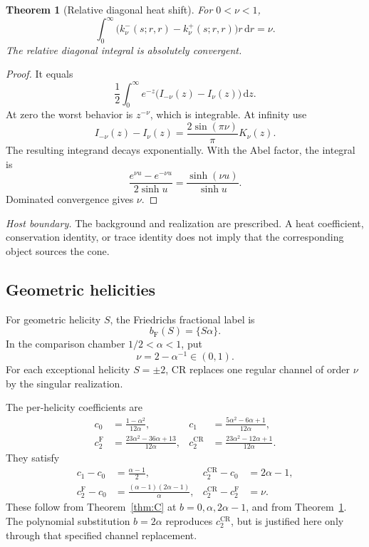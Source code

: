 \documentclass[11pt,a4paper]{article}
\newcommand{\dd}{\mathrm d}
\newcommand{\Fr}{\mathrm F}
\newcommand{\CR}{\mathrm{CR}}
\theoremstyle{plain}
\newtheorem{theorem}{Theorem}[section]
\theoremstyle{definition}
\theoremstyle{remark}
\numberwithin{equation}{section}
\newcommand{\nonsource}{%
  \par\smallskip\noindent
  \emph{Host boundary.}
  The background and realization are prescribed.
  A heat coefficient, conservation identity, or trace identity does
  not imply that the corresponding object sources the cone.%
}
\begin{document}
\begin{theorem}[Relative diagonal heat shift]
\label{thm:flip}
For \(0<\nu<1\),
\begin{equation}
 \int_0^\infty
 \bigl(k_\nu^-(s;r,r)-k_\nu^+(s;r,r)\bigr)r\,\dd r
 =\nu.
 \label{eq:flip}
\end{equation}
The relative diagonal integral is absolutely convergent.
\end{theorem}

\begin{proof}
It equals
\[
 \frac12\int_0^\infty
 e^{-z}\bigl(I_{-\nu}(z)-I_\nu(z)\bigr)\,\dd z.
\]
At zero the worst behavior is \(z^{-\nu}\), which is integrable.
At infinity use
\[
 I_{-\nu}(z)-I_\nu(z)
 =\frac{2\sin(\pi\nu)}{\pi}K_\nu(z).
\]
The resulting integrand decays exponentially.
With the Abel factor, the integral is
\[
 \frac{e^{\nu u}-e^{-\nu u}}{2\sinh u}
 =\frac{\sinh(\nu u)}{\sinh u}.
\]
Dominated convergence gives \(\nu\).
\end{proof}
\nonsource

\subsection{Geometric helicities}

For geometric helicity \(S\), the Friedrichs fractional label is
\[
 b_\Fr(S)=\{S\alpha\}.
\]
In the comparison chamber \(1/2<\alpha<1\), put
\begin{equation}
 \nu=2-\alpha^{-1}\in(0,1).
 \label{eq:nu}
\end{equation}
For each exceptional helicity \(S=\pm2\), CR replaces one regular
channel of order \(\nu\) by the singular realization.

The per-helicity coefficients are
\begin{align}
 c_0&=\frac{1-\alpha^2}{12\alpha},&
 c_1&=\frac{5\alpha^2-6\alpha+1}{12\alpha},\nonumber\\
 c_2^\Fr&=\frac{23\alpha^2-36\alpha+13}{12\alpha},&
 c_2^\CR&=\frac{23\alpha^2-12\alpha+1}{12\alpha}.
 \label{eq:cvalues}
\end{align}
They satisfy
\begin{align}
 c_1-c_0&=\frac{\alpha-1}{2},&
 c_2^\CR-c_0&=2\alpha-1,\nonumber\\
 c_2^\Fr-c_0&=\frac{(\alpha-1)(2\alpha-1)}{\alpha},&
 c_2^\CR-c_2^\Fr&=\nu.
 \label{eq:cdifferences}
\end{align}
These follow from Theorem~\ref{thm:C} at
\(b=0,\alpha,2\alpha-1\), and from Theorem~\ref{thm:flip}.
The polynomial substitution \(b=2\alpha\) reproduces
\(c_2^\CR\), but is justified here only through that specified
channel replacement.
\end{document}
